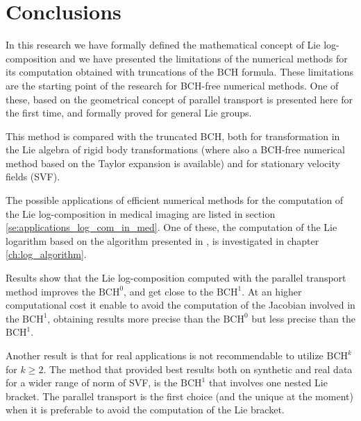 
\chapter{Conclusions}\label{ch:conclusions}

In this research we have formally defined the mathematical concept of Lie log-composition and we have presented the limitations of the numerical methods for its computation obtained with truncations of the BCH formula. These limitations are the starting point of the research for BCH-free numerical methods. 
One of these, based on the geometrical concept of parallel transport is presented here for the first time, and formally proved for general Lie groups.

This method is compared with the truncated BCH, both for transformation in the Lie algebra of rigid body transformations (where also a BCH-free numerical method based on the Taylor expansion is available) and for stationary velocity fields (SVF).

The possible applications of efficient numerical methods for the computation of the Lie log-composition in medical imaging are listed in section \ref{se:applications_log_com_in_med}. One of these, the computation of the Lie logarithm based on the algorithm presented in \cite{bossa2008new}, is investigated in chapter \ref{ch:log_algorithm}.

Results show that the Lie log-composition computed with the parallel transport method improves the $\text{BCH}^0$, and get close to the $\text{BCH}^1$. At an higher computational cost it enable to avoid the computation of the Jacobian involved in the $\text{BCH}^1$, obtaining results more precise than the $\text{BCH}^0$ but less precise than the $\text{BCH}^1$. 

Another result is that for real applications is not recommendable to utilize $\text{BCH}^k$ for $k\geq 2$. The method that provided best results both on synthetic and real data for a wider range of norm of SVF, is the $\text{BCH}^1$ that involves one nested Lie bracket. The parallel transport is the first choice (and the unique at the moment) when it is preferable to avoid the computation of the Lie bracket. 



